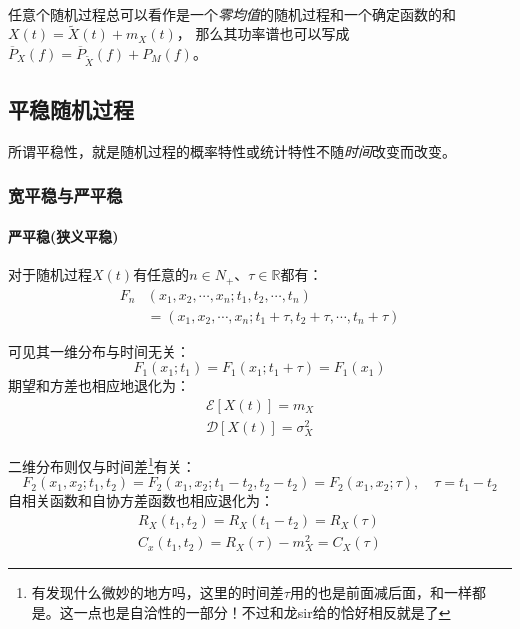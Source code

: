     \paragraph{}任意个随机过程总可以看作是一个\emph{零均值}的随机过程和一个确定函数的和$X(t)=\widetilde{X}(t)+m_X(t)$，
    那么其功率谱也可以写成$\overline{P}_X(f)=\overline{P}_{\widetilde{X}}(f)+P_M(f)$。
    
\subsection{平稳随机过程}
    所谓平稳性，就是随机过程的概率特性或统计特性不随\emph{时间}改变而改变。
    \subsubsection{宽平稳与严平稳}
        \paragraph{严平稳(狭义平稳)}
        对于随机过程$X(t)$有任意的$n\in N_+$、$\tau \in \mathbb{R}$都有：
        \begin{equation}
            \begin{split}
                F_n &(x_1,x_2,\cdots,x_n;t_1,t_2,\cdots,t_n)\\
                    &=(x_1,x_2,\cdots,x_n;t_1+\tau,t_2+\tau,\cdots,t_n+\tau)
            \end{split}
        \end{equation}

        可见其一维分布与时间无关：
        \begin{equation}
            F_1(x_1;t_1)=F_1(x_1;t_1+\tau)=F_1(x_1)
        \end{equation}
        期望和方差也相应地退化为：
        \begin{align}
            \mathscr{E}[X(t)]=m_X\\
            \mathscr{D}[X(t)]=\sigma_X^2
        \end{align}

        二维分布则仅与时间差\footnote{有发现什么微妙的地方吗，这里的时间差$\tau$用的也是前面减后面，和一样都是。这一点也是\textcolor{bupt}{自洽性}的一部分！不过和龙sir给的恰好相反就是了}有关：
        \begin{equation}
            F_2(x_1,x_2;t_1,t_2)=F_2(x_1,x_2;t_1-t_2,t_2-t_2)=F_2(x_1,x_2;\tau),\hspace{1em}\tau=t_1-t_2
        \end{equation}
        自相关函数和自协方差函数也相应退化为：
        \begin{align}
            R_X(t_1,t_2)=R_X(t_1-t_2)=R_X(\tau)\\
            C_x(t_1,t_2)=R_X(\tau)-m_X^2=C_X(\tau)
        \end{align}

